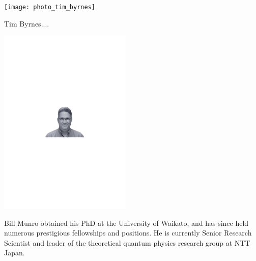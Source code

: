 
%
%

\begin{center}
\texttt{[image: photo\_tim\_byrnes]}
\end{center}

Tim Byrnes....


%
%

\begin{center}
\includegraphics[clip=true, width=0.475\textwidth]{photo_bill_munro}
\end{center}

Bill Munro obtained his PhD at the University of Waikato, and has since held numerous prestigious fellowships and positions. He is currently Senior Research Scientist and leader of the theoretical quantum physics research group at NTT Japan.

